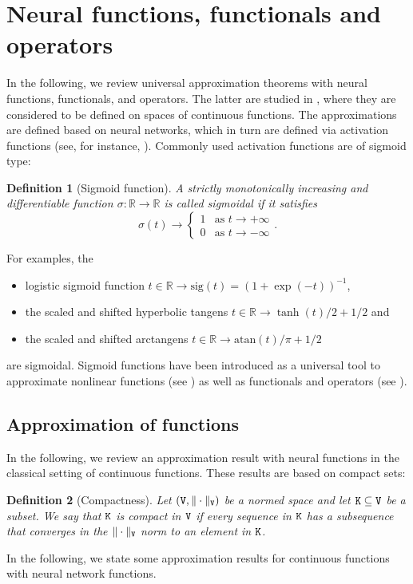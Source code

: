 \documentclass[10pt]{article}
\numberwithin{equation}{section}
\newtheorem{definition}[definition]{Definition}
\theoremstyle{nonumberplain}
\newcommand{\R}{\mathds{R}}
\newcommand{\norms}[1]{\|#1\|}
\newcommand{\V}{{\tt V}}
\begin{document}
\section{Neural functions, functionals and operators} \label{se:deeponet}

In the following, we review universal approximation theorems with neural functions, functionals, and operators. The latter are studied in \cite{TiaHon95}, where they are considered to be defined on spaces of continuous functions. The approximations are defined based on neural networks, which in turn are defined via activation functions (see, for instance, \cite{Cyb89,KirMejPerSchShi25_preprint}). Commonly used activation functions are of sigmoid type: 
\begin{definition}[Sigmoid function]\label{def:sigm_act} A strictly monotonically increasing and differentiable function $\sigma: \R \to \R$ is called \emph{sigmoidal} if it satisfies
	\begin{equation}\label{eq:sigm_act} \sigma(t) \to 
		\begin{cases}
			1 & \text{as } t \to +\infty \\
			0 & \text{as } t \to -\infty 
		\end{cases}.
	\end{equation}
\end{definition}
For examples, the 
\begin{itemize}
	\item logistic sigmoid function $t \in \R \to \text{sig}(t) =(1+\exp(-t))^{-1}$, 
	\item the scaled and shifted hyperbolic tangens $t \in \R \to \tanh(t)/2+1/2$ and  
	\item the scaled and shifted arctangens $t \in \R \to \text{atan}(t)/\pi+1/2$
\end{itemize}
are sigmoidal. 
Sigmoid functions have been introduced as a universal tool to approximate nonlinear functions (see \cite{Cyb89,HorStiWhi89b}) as well as functionals and operators (see \cite{CheChe93,TiaHon95}).

\subsection{Approximation of functions}
In the following, we review an approximation result with neural functions in the classical setting of continuous functions. These results are based on compact sets:
\begin{definition}[Compactness] \label{def:compact} 
	Let $(\V,\norms{\cdot}_\V)$ be a normed space and let ${\tt K} \subseteq \V$ be a subset. We say that ${\tt K}$ is compact in $\V$ if every sequence in ${\tt K}$ has a subsequence that converges in the $\norms{\cdot}_\V$ norm to an element in ${\tt K}$.
\end{definition}
In the following, we state some approximation results for continuous functions with neural network functions.
\end{document}
